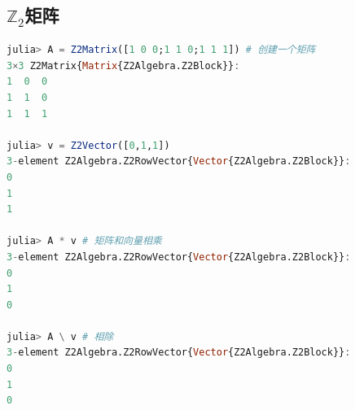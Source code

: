 \subsection{\texorpdfstring{$\mathbb{Z}_2$}{Z\textbackslash 2}矩阵}
\begin{lstlisting}[language=Julia, style=julia]
julia> A = Z2Matrix([1 0 0;1 1 0;1 1 1]) # 创建一个矩阵
3×3 Z2Matrix{Matrix{Z2Algebra.Z2Block}}:
1  0  0
1  1  0
1  1  1

julia> v = Z2Vector([0,1,1])
3-element Z2Algebra.Z2RowVector{Vector{Z2Algebra.Z2Block}}:
0
1
1

julia> A * v # 矩阵和向量相乘
3-element Z2Algebra.Z2RowVector{Vector{Z2Algebra.Z2Block}}:
0
1
0

julia> A \ v # 相除
3-element Z2Algebra.Z2RowVector{Vector{Z2Algebra.Z2Block}}:
0
1
0
\end{lstlisting}
